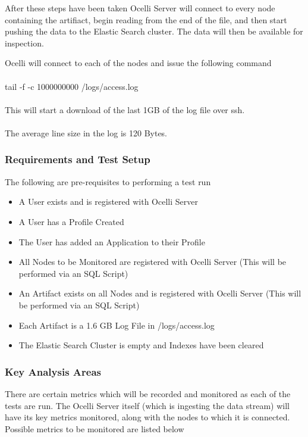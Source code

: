 \documentclass{llncs}
\begin{document}
After these steps have been taken Ocelli Server will connect to every node containing the artifiact, begin reading from the end of the file, and then start pushing the data to the Elastic Search cluster. The data will then be available for inspection.

Ocelli will connect to each of the nodes and issue the following command
\\
\\
tail -f -c 1000000000 /logs/access.log
\\
\\
This will start a download of the last 1GB of the log file over ssh. 
\\
\\
The average line size in the log is 120 Bytes.

\subsubsection{Requirements and Test Setup}

The following are pre-requisites to performing a test run

\begin{itemize}
\item A User exists and is registered with Ocelli Server 
\item A User has a Profile Created
\item The User has added an Application to their Profile
\item All Nodes to be Monitored are registered with Ocelli Server (This will be performed via an SQL Script)
\item An Artifact exists on all Nodes and is registered with Ocelli Server (This will be performed via an SQL Script)
\item Each Artifact is a 1.6 GB Log File in /logs/access.log
\item The Elastic Search Cluster is empty and Indexes have been cleared
 \end{itemize}

\subsubsection{Key Analysis Areas}

There are certain metrics which will be recorded and monitored as each of the tests are run. The Ocelli Server itself (which is ingesting the data stream) will have its key metrics monitored, along with the nodes to which it is connected. Possible metrics to be monitored are listed below
\end{document}
